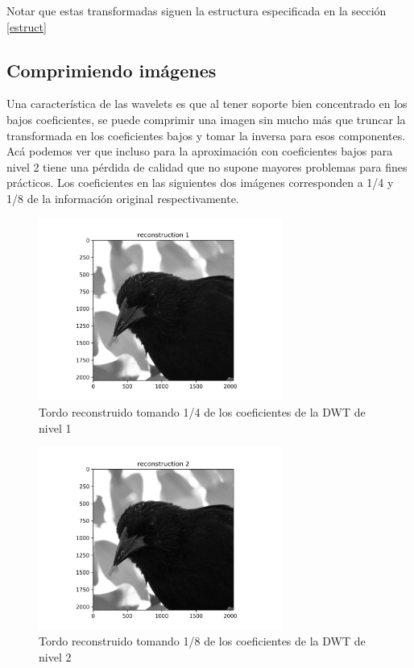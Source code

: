 \documentclass[conference]{IEEEtran}
\begin{document}
Notar que estas transformadas siguen la estructura especificada en la sección \ref{estruct}


\subsection{Comprimiendo imágenes}

Una característica de las wavelets es que al tener soporte bien concentrado en los bajos coeficientes\cite{turbulence}, se puede comprimir una imagen sin mucho más que truncar la transformada en los coeficientes bajos y tomar la inversa para esos componentes. Acá podemos ver que incluso para la aproximación con coeficientes bajos para nivel 2 tiene una pérdida de calidad que no supone mayores problemas para fines prácticos. Los coeficientes en las siguientes dos imágenes corresponden a 1/4 y 1/8 de la información original respectivamente.


\begin{figure}[H]
\includegraphics[width=8cm]{images/tordo_r_1.png}
\caption{Tordo reconstruido tomando 1/4 de los coeficientes de la DWT de nivel 1}
\end{figure}



\begin{figure}[H]
\includegraphics[width=8cm]{images/tordo_r_2.png}
\caption{Tordo reconstruido tomando 1/8 de los coeficientes de la DWT de nivel 2}
\end{figure}
\end{document}

